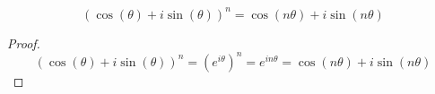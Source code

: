 \documentclass{article}
\begin{document}
\begin{theorem}
    \begin{equation}
        (\cos(\theta) + i \sin(\theta))^n = \cos(n \theta) + i \sin(n \theta)
    \end{equation}
\end{theorem}
\begin{proof}
    \begin{equation} 
        (\cos(\theta) + i \sin(\theta))^n = (e^{i \theta})^n = e^{i n \theta} = \cos(n \theta) + i \sin(n \theta)
    \end{equation}
\end{proof}

\subsection{}
\end{document}
